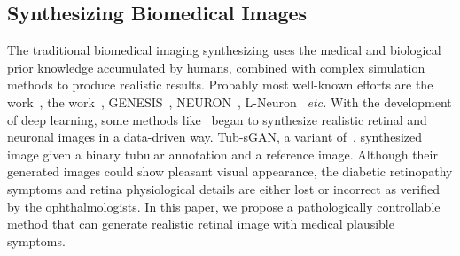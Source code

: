 \documentclass[letterpaper]{article} %
\begin{document}
	\subsection{Synthesizing Biomedical Images}

	The traditional biomedical imaging synthesizing uses the medical and biological prior knowledge accumulated by humans, combined with complex simulation methods to produce realistic results. 	Probably most well-known efforts are the work~\cite{fiorini2014automatic}, the work~\cite{bonaldi2016automatic}, GENESIS~\cite{bower2015genesis}, NEURON~\cite{carnevale2006neuron}, L-Neuron~\cite{ascoli2000neuron} \textit{etc.}
	With the development of deep learning, some methods like~\cite{zhao2018synthesizing} began to synthesize realistic retinal and neuronal images in a data-driven way. Tub-sGAN, a variant of~\cite{zhao2018synthesizing}, synthesized image given a binary tubular annotation and a reference image. Although their generated images could show pleasant visual appearance, the diabetic retinopathy symptoms and retina physiological details are either lost or  incorrect as verified by the ophthalmologists. In this paper, we propose a pathologically controllable method that can generate realistic retinal image with medical plausible symptoms.


















\end{document}
